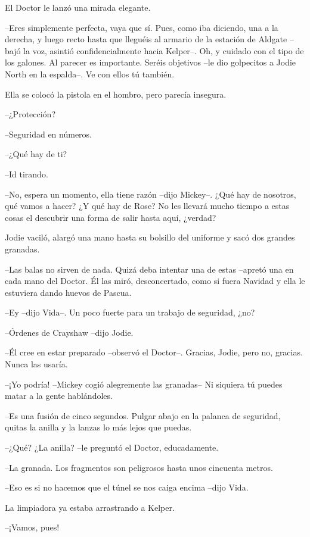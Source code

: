 {El Doctor le lanzó una mirada elegante.}

{--Eres simplemente perfecta, vaya que sí. Pues, como iba diciendo, una
 a la derecha, y luego recto hasta que lleguéis al armario de la estación
 de Aldgate --bajó la voz, asintió confidencialmente hacia Kelper--. Oh,
 y cuidado con el tipo de los galones. Al parecer es importante. Seréis
 objetivos --le dio golpecitos a Jodie North en la espalda--. Ve con
ellos tú también.}

{Ella se colocó la pistola en el hombro, pero parecía insegura.}

{--¿Protección?}

{--Seguridad en números.}

{--¿Qué hay de ti?}

{--Id tirando.}

{--No, espera un momento, ella tiene razón --dijo Mickey--. ¿Qué hay de
 nosotros, qué vamos a hacer? ¿Y qué hay de Rose? No les llevará mucho
 tiempo a estas cosas el descubrir una forma de salir hasta aquí,
¿verdad?}

{Jodie vaciló, alargó una mano hasta su bolsillo del uniforme y sacó dos
grandes granadas.}

{--Las balas no sirven de nada. Quizá deba intentar una de estas
 --apretó una en cada mano del Doctor. Él las miró, desconcertado, como
si fuera Navidad y ella le estuviera dando huevos de Pascua.}

{--Ey --dijo Vida--. Un poco fuerte para un trabajo de seguridad, ¿no?}

{--Órdenes de Crayshaw --dijo Jodie.}

{--Él cree en estar preparado --observó el Doctor--. Gracias, Jodie,
pero no, gracias. Nunca las usaría.}

{--¡Yo podría! --Mickey cogió alegremente las granadas-- Ni siquiera tú
puedes matar a la gente hablándoles.}

{--Es una fusión de cinco segundos. Pulgar abajo en la palanca de
seguridad, quitas la anilla y la lanzas lo más lejos que puedas.}

{--¿Qué? ¿La anilla? --le preguntó el Doctor, educadamente.}

{--La granada. Los fragmentos son peligrosos hasta unos cincuenta
metros.}

{--Eso es si no hacemos que el túnel se nos caiga encima --dijo Vida.}

{La limpiadora ya estaba arrastrando a Kelper.}

{--¡Vamos, pues!}

